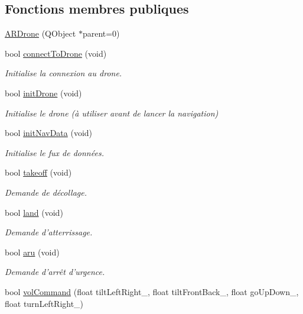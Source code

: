 \subsection*{Fonctions membres publiques}
\begin{DoxyCompactItemize}
\item 
\hyperlink{class_a_r_drone_a9f5df81d1e4b136238e7b89b03cf915b}{A\-R\-Drone} (Q\-Object $\ast$parent=0)
\item 
bool \hyperlink{class_a_r_drone_a0ba4b4e4cf7a107a1587152af3f4fbab}{connect\-To\-Drone} (void)
\begin{DoxyCompactList}\small\item\em Initialise la connexion au drone. \end{DoxyCompactList}\item 
bool \hyperlink{class_a_r_drone_ab447af60c30509710f55922ff07fc3a4}{init\-Drone} (void)
\begin{DoxyCompactList}\small\item\em Initialise le drone (à utiliser avant de lancer la navigation) \end{DoxyCompactList}\item 
bool \hyperlink{class_a_r_drone_a36946b429549afb5b1d64c0ff1fe4fbb}{init\-Nav\-Data} (void)
\begin{DoxyCompactList}\small\item\em Initialise le fux de données. \end{DoxyCompactList}\item 
bool \hyperlink{class_a_r_drone_a34d3e2ff71b9fc05e2faa20015d320c8}{takeoff} (void)
\begin{DoxyCompactList}\small\item\em Demande de décollage. \end{DoxyCompactList}\item 
bool \hyperlink{class_a_r_drone_a4735e9dbf7f8c0c43a6e4f55511d7262}{land} (void)
\begin{DoxyCompactList}\small\item\em Demande d'atterrissage. \end{DoxyCompactList}\item 
bool \hyperlink{class_a_r_drone_ac0bf02a934602af7eb48e20e2717bb3e}{aru} (void)
\begin{DoxyCompactList}\small\item\em Demande d'arrêt d'urgence. \end{DoxyCompactList}\item 
bool \hyperlink{class_a_r_drone_a4a3c6bdd5043578998f074ca7a85d146}{vol\-Command} (float tilt\-Left\-Right\-\_\-, float tilt\-Front\-Back\-\_\-, float go\-Up\-Down\-\_\-, float turn\-Left\-Right\-\_\-)

\end{DoxyCompactItemize}
